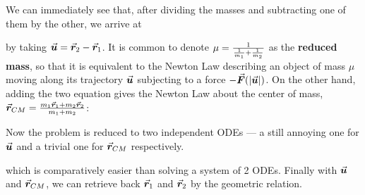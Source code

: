 \documentclass[class=article, crop=false, 12pt]{standalone}
\begin{document}
We can immediately see that, after dividing the masses and subtracting one of them by the other, we arrive at

by taking $\va*{u} = \va*{r}_2 - \va*{r}_1$. It is common to denote $\mu = \frac{1}{\frac{1}{m_1}+\frac{1}{m_2}}$ as the \textbf{reduced mass}, 
so that it is equivalent to the Newton  Law describing an object of mass $\mu$ moving along its trajectory $\va*{u}$ subjecting to a force $-\va*{F}(\abs{\va*{u}})$. 
On the other hand, adding the two equation gives the Newton  Law about the center of mass, $\va*{r}_{CM} = \frac{m_1\va*{r}_1+m_2\va*{r}_2}{m_1+m_2}$:


Now the problem is reduced to two independent ODEs --- a still annoying one for $\va*{u}$ and a trivial one for $\va*{r}_{CM}$ respectively.

which is comparatively easier than solving a system of 2 ODEs. 
Finally with $\va*{u}$ and $\va*{r}_{CM}$, we can retrieve back $\va*{r}_1$ and $\va*{r}_2$ by the geometric relation.
\end{document}

